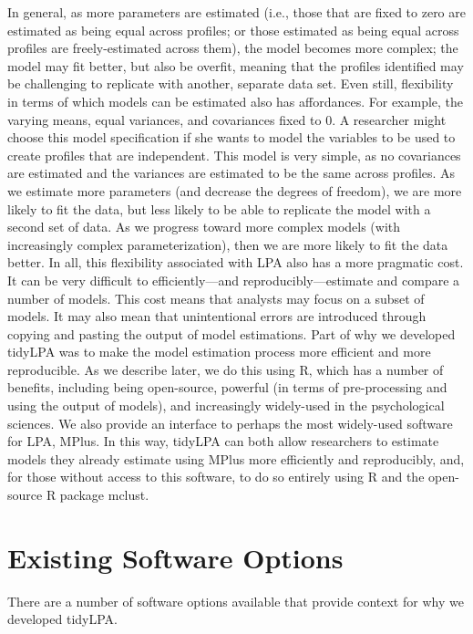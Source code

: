 \documentclass[english,man]{apa6}
\begin{document}
In general, as more parameters are estimated (i.e., those that are fixed to zero
are estimated as being equal across profiles; or those estimated as being equal
across profiles are freely-estimated across them), the model becomes more
complex; the model may fit better, but also be overfit, meaning that the
profiles identified may be challenging to replicate with another, separate data
set. Even still, flexibility in terms of which models can be estimated also has
affordances. For example, the varying means, equal variances, and covariances
fixed to 0. A researcher might choose this model specification if she wants to
model the variables to be used to create profiles that are independent. This
model is very simple, as no covariances are estimated and the variances are
estimated to be the same across profiles. As we estimate more parameters (and
decrease the degrees of freedom), we are more likely to fit the data, but less
likely to be able to replicate the model with a second set of data. As we
progress toward more complex models (with increasingly complex
parameterization), then we are more likely to fit the data better.
In all, this flexibility associated with LPA also has a more pragmatic cost. It
can be very difficult to efficiently---and reproducibly---estimate and compare a
number of models. This cost means that analysts may focus on a subset of models.
It may also mean that unintentional errors are introduced through copying and
pasting the output of model estimations. Part of why we developed tidyLPA was to
make the model estimation process more efficient and more reproducible. As we
describe later, we do this using R, which has a number of benefits, including
being open-source, powerful (in terms of pre-processing and using the output of
models), and increasingly widely-used in the psychological sciences. We also
provide an interface to perhaps the most widely-used software for LPA, MPlus. In
this way, tidyLPA can both allow researchers to estimate models they already
estimate using MPlus more efficiently and reproducibly, and, for those without
access to this software, to do so entirely using R and the open-source R package
mclust.

\hypertarget{existing-software-options}{%
\section{Existing Software Options}\label{existing-software-options}}

There are a number of software options available that provide context for why we
developed tidyLPA.
\end{document}
